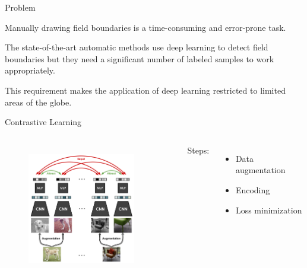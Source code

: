 \documentclass[xcolor=table]{beamer}
\begin{document}
\begin{frame}{Problem}
	
	\begin{tcolorbox}[colback=red!5,colframe=red!75!black]
		Manually drawing field boundaries is a time-consuming and error-prone task.
	\end{tcolorbox}
	
	\begin{tcolorbox}[colback=red!5,colframe=red!75!black]
		The state-of-the-art automatic methods use deep learning to detect field boundaries but they need a significant number of labeled samples to work appropriately.
	\end{tcolorbox}
	
	\begin{tcolorbox}[colback=red!5,colframe=red!75!black]
		This requirement makes the application of deep learning restricted to limited areas of the globe. 
	\end{tcolorbox}
		
\end{frame}

\begin{frame}{Contrastive Learning}
	
	\begin{columns}

		\begin{figure}[htb]
      			\includegraphics[height=5cm]{figs/contrastive_learning.png}
      			\label{fig:simCLR}
		\end{figure}
		~\flushright \tiny \cite{chen2020}
	
  
		\pause
 
		Steps: \\
		\begin{itemize}
			\item Data augmentation
			\item Encoding
			\item Loss minimization
		\end{itemize}
	    
		\bigskip
	
	\end{columns}

\end{frame}
\end{document}
